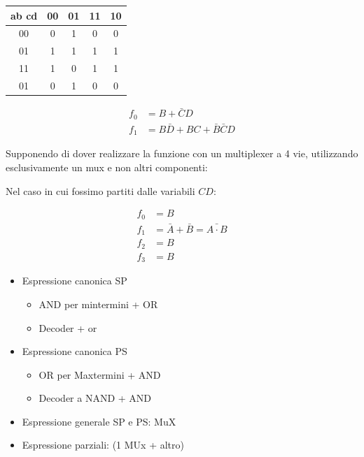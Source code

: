 \documentclass{article}
\begin{document}

\begin{minipage}{0.4\textwidth}
\begin{center}
\begin{tabular}{c|c|c|c|c|}
     ab cd & 00 & 01 & 11 & 10\\
     \hline
     00 &  0 & 1 & 0 & 0\\
     \hline
     01 & 1 & 1 & 1 & 1\\
     \hline
     11 & 1 & 0 & 1 & 1\\
     \hline
     01 & 0 & 1 & 0 & 0\\
     \hline
\end{tabular}
\end{center}
\end{minipage}
\begin{minipage}{0.4\textwidth}
\[
    \begin{split}
        f_0 &= B + \bar{C} D\\
        f_1 &= B \bar{D} + BC + \bar{B}\bar{C}D
    \end{split}
\]
\end{minipage}

Supponendo di dover realizzare la funzione con un multiplexer a 4 vie, utilizzando esclusivamente un mux e non altri componenti:


Nel caso in cui fossimo partiti dalle variabili $CD$:

\[
    \begin{split}
        f_0 &= B\\
        f_1 &= \bar{A} + \bar{B} = \bar{A\cdot B}\\
        f_2 &= B\\
        f_3 &= B
    \end{split}
\]

\begin{itemize}
    \item Espressione canonica SP
        \begin{itemize}
            \item AND per mintermini + OR
            \item Decoder + or
        \end{itemize}
    \item Espressione canonica PS
        \begin{itemize}
            \item OR per Maxtermini + AND
            \item Decoder a NAND + AND
        \end{itemize}
    \item Espressione generale SP e PS: MuX
    \item Espressione parziali: (1 MUx + altro)
\end{itemize}
\end{document}
